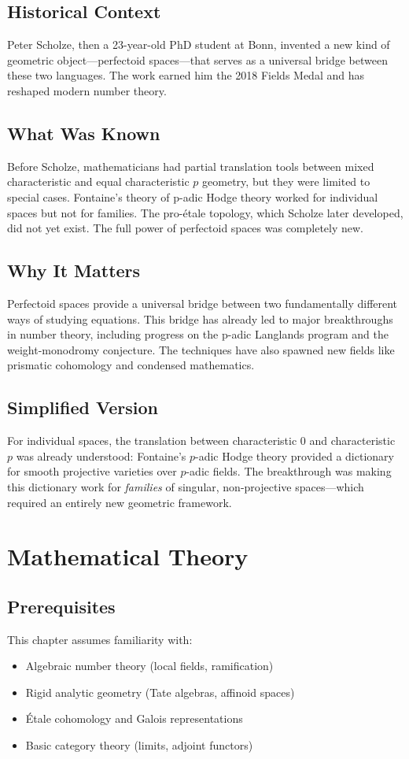 \subsection{Historical Context}
Peter Scholze, then a 23-year-old PhD student at Bonn, invented a new kind of geometric object---perfectoid spaces---that serves as a universal bridge between these two languages. The work earned him the 2018 Fields Medal and has reshaped modern number theory.

\subsection{What Was Known}
Before Scholze, mathematicians had partial translation tools between mixed characteristic and equal characteristic $p$ geometry, but they were limited to special cases. Fontaine's theory of p-adic Hodge theory worked for individual spaces but not for families. The pro-\'etale topology, which Scholze later developed, did not yet exist. The full power of perfectoid spaces was completely new.

\subsection{Why It Matters}
Perfectoid spaces provide a universal bridge between two fundamentally different ways of studying equations. This bridge has already led to major breakthroughs in number theory, including progress on the p-adic Langlands program and the weight-monodromy conjecture. The techniques have also spawned new fields like prismatic cohomology and condensed mathematics.

\subsection{Simplified Version}
For individual spaces, the translation between characteristic 0 and characteristic $p$ was already understood: Fontaine's $p$-adic Hodge theory provided a dictionary for smooth projective varieties over $p$-adic fields. The breakthrough was making this dictionary work for \emph{families} of singular, non-projective spaces---which required an entirely new geometric framework.

\section{Mathematical Theory}


\subsection{Prerequisites}
This chapter assumes familiarity with:
\begin{itemize}
\item Algebraic number theory (local fields, ramification)
\item Rigid analytic geometry (Tate algebras, affinoid spaces)
\item \'Etale cohomology and Galois representations
\item Basic category theory (limits, adjoint functors)
\end{itemize}

